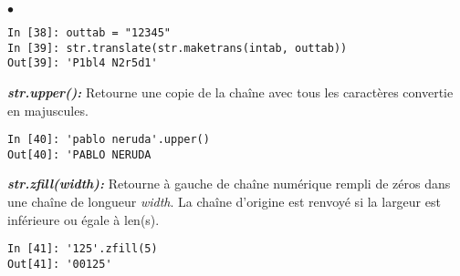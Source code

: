 \documentclass[10pt,dvipsnames,  dvips]{article}
\begin{document}
\begin{list}{$\bullet$}{}
\begin{lstlisting}
In [38]: outtab = "12345"
In [39]: str.translate(str.maketrans(intab, outtab))
Out[39]: 'P1bl4 N2r5d1'
\end{lstlisting}
\item \textit{\textbf{str.upper(): }} Retourne une copie de la chaîne avec tous les caractères convertie en majuscules.
\begin{lstlisting}
In [40]: 'pablo neruda'.upper()
Out[40]: 'PABLO NERUDA
\end{lstlisting}
\item \textit{\textbf{str.zfill(width): }} Retourne à gauche de chaîne numérique rempli de zéros dans une chaîne de longueur \textit{width}. La chaîne d'origine est renvoyé si la largeur est inférieure ou égale à len(s).
\begin{lstlisting}
In [41]: '125'.zfill(5)
Out[41]: '00125'
\end{lstlisting}
\end{list}
\end{document}
